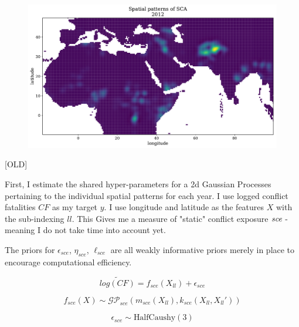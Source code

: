 \documentclass[a4paper]{article}
\begin{document}
\begin{figure}[!htb]
	\centering
	\includegraphics[scale=0.47]{sce_2012_samples.pdf}
    \caption{\footnotesize{}}
\end{figure}












[OLD]
















First, I estimate the shared hyper-parameters for a 2d Gaussian Processes pertaining to the individual spatial patterns for each year. I use logged conflict fatalities $CF$ as my target $y$. I use longitude and latitude as the features $X$ with the sub-indexing $ll$. This Gives me a measure of "static" conflict exposure $\emph{sce}$ - meaning I do not take time into account yet.\par

The priors for $\epsilon_{sce}$, $\eta_{sce}$, $\ell_{sce}$ are all weakly informative priors merely in place to encourage computational efficiency.\par

\[
\widetilde{log(CF)} = f_{sce}(X_{ll}) + \epsilon_{sce}
\]

\[
f_{sce}(X) \sim \mathcal{GP}_{sce}(m_{sce}(X_{ll}),k_{sce}(X_{ll},X_{ll}')) %
\]

\[
\epsilon_{sce} \sim \text{HalfCaushy}(3)
\]
\end{document}

